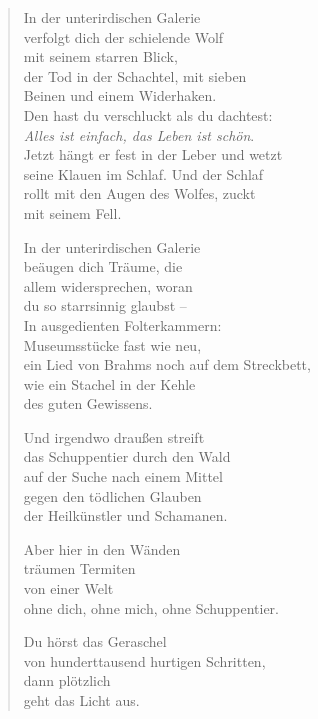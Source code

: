
\cleartoverso


\begin{verse}

In der unterirdischen Galerie\\
verfolgt dich der schielende Wolf\\
mit seinem starren Blick,\\
der Tod in der Schachtel, mit sieben\\
Beinen und einem Widerhaken.\\
Den hast du verschluckt als du dachtest:\\
\emph{Alles ist einfach, das Leben ist schön}.\\
Jetzt hängt er fest in der Leber und wetzt\\
seine Klauen im Schlaf. Und der Schlaf\\
rollt mit den Augen des Wolfes, zuckt\\
mit seinem Fell.

In der unterirdischen Galerie\\
beäugen dich Träume, die\\
allem widersprechen, woran\\
du so starrsinnig glaubst --\\
In ausgedienten Folterkammern:\\
Museumsstücke fast wie neu,\\
ein Lied von Brahms noch auf dem Streckbett,\\
wie ein Stachel in der Kehle\\
des guten Gewissens.

\clearpage

Und irgendwo draußen streift\\
das Schuppentier durch den Wald\\
auf der Suche nach einem Mittel\\
gegen den tödlichen Glauben\\
der Heilkünstler und Schamanen.

Aber hier in den Wänden\\
träumen Termiten\\
von einer Welt\\
ohne dich, ohne mich, ohne Schuppentier.

Du hörst das Geraschel\\
von hunderttausend hurtigen Schritten,\\
dann plötzlich\\
geht das Licht aus.

\end{verse}

